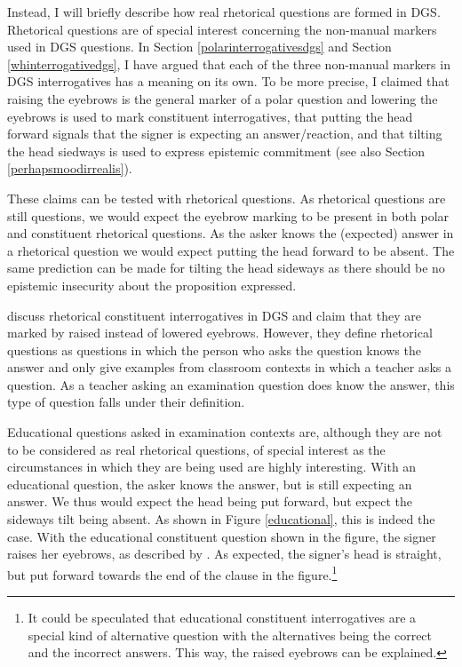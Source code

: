 \noindent Instead, I will briefly describe how real rhetorical questions are formed in DGS. Rhetorical questions are of special interest concerning the non-manual markers used in DGS questions. In Section \ref{polarinterrogativesdgs} and Section \ref{whinterrogativedgs}, I have argued that each of the three non-manual markers in DGS interrogatives has a meaning on its own. To be more precise, I claimed that raising the eyebrows is the general marker of a polar question and lowering the eyebrows is used to mark constituent interrogatives, that putting the head forward signals that the signer is expecting an answer/reaction, and that tilting the head siedways is used to express epistemic commitment (see also Section \ref{perhapsmoodirrealis}). 

These claims can be tested with rhetorical questions. As rhetorical questions are still questions, we would expect the eyebrow marking to be present in both polar and constituent rhetorical questions. As the asker knows the (expected) answer in a rhetorical question we would expect putting the head forward to be absent. The same prediction can be made for tilting the head sideways as there should be no epistemic insecurity about the proposition expressed. 

\citet[333]{happ2014vork} discuss rhetorical constituent interrogatives in DGS and claim that they are marked by raised instead of lowered eyebrows. However, they define rhetorical questions as questions in which the person who asks the question knows the answer and only give examples from classroom contexts in which a teacher asks a question. As a teacher asking an examination question does know the answer, this type of question falls under their definition.

Educational questions asked in examination contexts are, although they are not to be considered as real rhetorical questions, of special interest as the circumstances in which they are being used are highly interesting. With an educational question, the asker knows the answer, but is still expecting an answer. We thus would expect the head being put forward, but expect the sideways tilt being absent. As shown in Figure \ref{educational}, this is indeed the case. With the educational constituent question shown in the figure, the signer raises her eyebrows, as described by \citet{happ2014vork}. As expected, the signer's head is straight, but put forward towards the end of the clause in the figure.\footnote{ It could be speculated that educational constituent interrogatives are a special kind of alternative question with the alternatives being the correct and the incorrect answers. This way, the raised eyebrows can be explained.}


